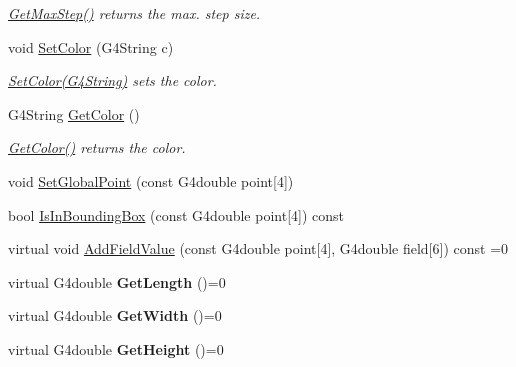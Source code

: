 \begin{DoxyCompactItemize}
\begin{DoxyCompactList}\small\item\em \hyperlink{classEMMAElementField_ad3dc48616b3869104b10dc1007b6c95e}{Get\-Max\-Step()} returns the max. step size. \end{DoxyCompactList}\item 
\hypertarget{classEMMAElementField_aa5c4c2ca091dd120a76a59ef790a6758}{void \hyperlink{classEMMAElementField_aa5c4c2ca091dd120a76a59ef790a6758}{Set\-Color} (G4\-String c)}\label{classEMMAElementField_aa5c4c2ca091dd120a76a59ef790a6758}

\begin{DoxyCompactList}\small\item\em \hyperlink{classEMMAElementField_aa5c4c2ca091dd120a76a59ef790a6758}{Set\-Color(\-G4\-String)} sets the color. \end{DoxyCompactList}\item 
\hypertarget{classEMMAElementField_a0a67e3bc2f8393d62ee76503f9aeaf7c}{G4\-String \hyperlink{classEMMAElementField_a0a67e3bc2f8393d62ee76503f9aeaf7c}{Get\-Color} ()}\label{classEMMAElementField_a0a67e3bc2f8393d62ee76503f9aeaf7c}

\begin{DoxyCompactList}\small\item\em \hyperlink{classEMMAElementField_a0a67e3bc2f8393d62ee76503f9aeaf7c}{Get\-Color()} returns the color. \end{DoxyCompactList}\item 
void \hyperlink{classEMMAElementField_af4362c2dbb660e9eaab6d9207e29acda}{Set\-Global\-Point} (const G4double point\mbox{[}4\mbox{]})
\item 
bool \hyperlink{classEMMAElementField_aabb0a5f52245b11bcd16efa8c9dc7338}{Is\-In\-Bounding\-Box} (const G4double point\mbox{[}4\mbox{]}) const 
\item 
virtual void \hyperlink{classEMMAElementField_acec8d9002f079755715ffd5b7ba7e900}{Add\-Field\-Value} (const G4double point\mbox{[}4\mbox{]}, G4double field\mbox{[}6\mbox{]}) const =0
\item 
\hypertarget{classEMMAElementField_adb2d90c3fdf25e17be541903bffca35b}{virtual G4double {\bfseries Get\-Length} ()=0}\label{classEMMAElementField_adb2d90c3fdf25e17be541903bffca35b}

\item 
\hypertarget{classEMMAElementField_a41708a8f1e72d7788c0a53c80c297bf9}{virtual G4double {\bfseries Get\-Width} ()=0}\label{classEMMAElementField_a41708a8f1e72d7788c0a53c80c297bf9}

\item 
\hypertarget{classEMMAElementField_a3cbd223805ba24b5313e16ca540c326c}{virtual G4double {\bfseries Get\-Height} ()=0}\label{classEMMAElementField_a3cbd223805ba24b5313e16ca540c326c}

\end{DoxyCompactItemize}
